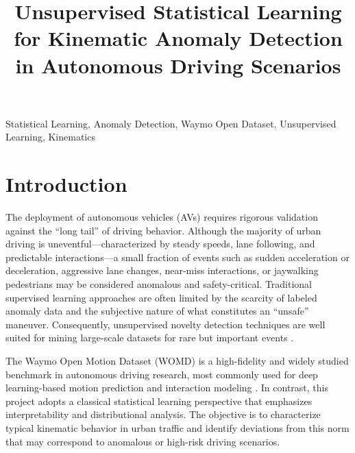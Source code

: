 \documentclass[conference]{IEEEtran}
\begin{document}
\title{Unsupervised Statistical Learning for Kinematic Anomaly Detection in Autonomous Driving Scenarios}

\author{
\and
{}
\and
{}
}

\maketitle

\begin{IEEEkeywords}
Statistical Learning, Anomaly Detection, Waymo Open Dataset, Unsupervised Learning, Kinematics
\end{IEEEkeywords}

\section{Introduction}
The deployment of autonomous vehicles (AVs) requires rigorous validation against the ``long tail'' of driving behavior. Although the majority of urban driving is uneventful—characterized by steady speeds, lane following, and predictable interactions—a small fraction of events such as sudden acceleration or deceleration, aggressive lane changes, near-miss interactions, or jaywalking pedestrians may be considered anomalous and safety-critical. Traditional supervised learning approaches are often limited by the scarcity of labeled anomaly data and the subjective nature of what constitutes an ``unsafe'' maneuver. Consequently, unsupervised novelty detection techniques are well suited for mining large-scale datasets for rare but important events \cite{pimentel2014review}.

The Waymo Open Motion Dataset (WOMD) is a high-fidelity and widely studied benchmark in autonomous driving research, most commonly used for deep learning-based motion prediction and interaction modeling \cite{ettinger2021waymo}. In contrast, this project adopts a classical statistical learning perspective that emphasizes interpretability and distributional analysis. The objective is to characterize typical kinematic behavior in urban traffic and identify deviations from this norm that may correspond to anomalous or high-risk driving scenarios.
\end{document}
